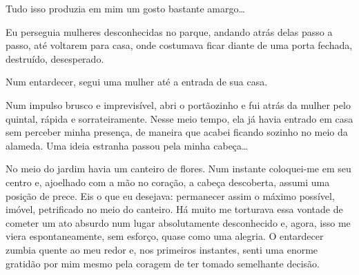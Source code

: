 
Tudo isso produzia em mim um gosto bastante amargo\ldots{}

Eu perseguia mulheres desconhecidas no parque, andando atrás delas passo a
passo, até voltarem para casa, onde costumava ficar diante de uma porta
fechada, destruído, desesperado.

Num entardecer, segui uma mulher até a entrada de sua casa.


Num impulso brusco e imprevisível, abri o portãozinho e fui atrás da mulher
pelo quintal, rápida e sorrateiramente. Nesse meio tempo, ela já havia
entrado em casa sem perceber minha presença, de maneira que acabei ficando
sozinho no meio da alameda. Uma ideia estranha passou pela minha cabeça\ldots
{}

No meio do jardim havia um canteiro de flores. Num instante coloquei-me em seu
centro e, ajoelhado com a mão no coração, a cabeça descoberta, assumi uma
posição de prece. Eis o que eu desejava: permanecer assim o máximo possível,
imóvel, petrificado no meio do canteiro. Há muito me torturava essa vontade
de cometer um ato absurdo num lugar absolutamente desconhecido e, agora, isso
me viera espontaneamente, sem esforço, quase como uma alegria. O entardecer
zumbia quente ao meu redor e, nos primeiros instantes, senti uma enorme
gratidão por mim mesmo pela coragem de ter tomado semelhante decisão.




